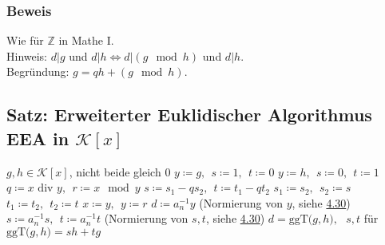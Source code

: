 \documentclass[12pt,titlepage, pdf]{article}
\newcommand{\Z}{\mathds{Z}}
\newcommand{\K}{\mathcal{K}}
\newcommand{\ggT}[1]{\textrm{ggT($#1$)}}
\renewcommand{\div}{\textrm{  div }}
\renewcommand{\>}{\rightarrow}
\renewcommand{\*}{\cdot}
\begin{document}
		      	\subsubsection*{Beweis}
		      	Wie für $\Z$ in Mathe I.\\
		      	Hinweis: $d\vert g$ und $d\vert h\Leftrightarrow d\vert (g\mod h)$ und $d\vert h$.\\
		      	Begründung: $g=qh+(g\mod h)$.
		      	\subsection{Satz: Erweiterter Euklidischer Algorithmus EEA  in $\K[x]$}
		      	\label{4.33}
		      	\begin{algorithmic}[1]
		      		\algrenewcommand{}
		      		\algrenewcommand{}
		      		\Statex
		      		\Require $g,h\in \K[x]$, nicht beide gleich 0
		      		\State $y\coloneqq g,~~s\coloneqq 1,~~t\coloneqq0$
		      		\EndIf
		      		\State $y\coloneqq h,~~s\coloneqq 0,~~t\coloneqq1$
		      		\EndIf
		      		\State $q\coloneqq x\div y,~~r\coloneqq x\mod y$
		      		\State $s\coloneqq s_1-qs_2,~~t\coloneqq t_1-qt_2$
		      		\State $s_1\coloneqq s_2,~~s_2\coloneqq s$
		      		\State $t_1\coloneqq t_2,~~t_2\coloneqq t$
		      		\State $x\coloneqq y,~~y\coloneqq r$
		      		\EndWhile
		      		\EndIf
		      		\State $d\coloneqq a^{-1}_ny$ (Normierung von $y$, siehe \hyperref[4.30]{4.30})
		      		\State $s\coloneqq a^{-1}_ns,~~t\coloneqq a^{-1}_nt$ (Normierung von $s,t$, siehe \hyperref[4.30]{4.30})
		      		\Ensure $d=\ggT{g,h},~~~s,t$ für $\ggT{g,h}=sh+tg$
		      	\end{algorithmic}
\end{document}
